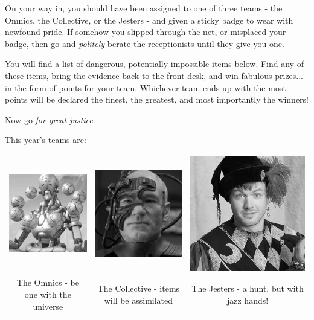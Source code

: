 On your way in, you should have been assigned to one of three teams - the Omnics, the Collective, or the Jesters - and given a sticky badge to wear with newfound pride.
If somehow you slipped through the net,
or misplaced your badge,
then go and \emph{politely} berate the receptionists until they give you one.

You will find a list of dangerous, potentially impossible items below.
Find any of these items, bring the evidence back to the front desk, and win fabulous prizes... in the form of points for your team.
Whichever team ends up with the most points will be declared the finest, the greatest, and most importantly the winners!

Now go \emph{for great justice}.

This year's teams are:

\begin{tabular}{ccc}
	\includegraphics[width=0.2\columnwidth]{pictures/zenyatta} &
	\includegraphics[width=0.2\columnwidth]{pictures/borg} &
	\includegraphics[width=0.2\columnwidth]{pictures/jester} \\

	\parbox{0.3\textwidth}{\center\large The Omnics - be one with the universe} &
	\parbox{0.3\textwidth}{\center\large The Collective - items will be assimilated} &
	\parbox{0.3\textwidth}{\center\large The Jesters - a hunt, but with jazz hands!} \\
\end{tabular}
\vspace{5mm}

